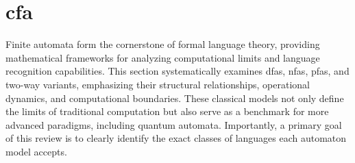 \section{\acrfull{cfa}}
\label{sec:classical-finite-automata} 

Finite automata form the cornerstone of formal language theory, providing mathematical frameworks for analyzing computational limits and language recognition capabilities. This section systematically examines \glspl{dfa}, \glspl{nfa}, \glspl{pfa}, and two-way variants, emphasizing their structural relationships, operational dynamics, and computational boundaries. These classical models not only define the limits of traditional computation but also serve as a benchmark for more advanced paradigms, including quantum automata. Importantly, a primary goal of this review is to clearly identify the exact classes of languages each automaton model accepts.






